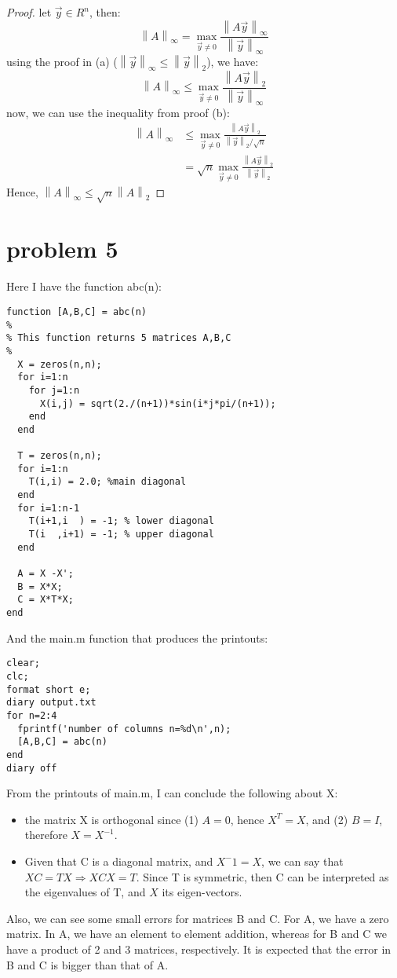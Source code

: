 \documentclass[10pt]{article}
\newcommand{\normi}[1]{\left\lVert#1\right\rVert_\infty}
\newcommand{\normt}[1]{\left\lVert#1\right\rVert_2}
\begin{document}
\begin{proof}
  let $\vec{y}\in R^n$, then:
  \[
    \normi{A} = \max_{\vec{y}\neq 0} \frac{\normi{A\vec{y}}}{\normi{\vec{y}}}
  \]
    using the proof in (a) ($\normi{\vec{y}} \leq \normt{\vec{y}}$), we have:
  \[
    \normi{A} \leq \max_{\vec{y}\neq 0} \frac{\normt{A\vec{y}}}{\normi{\vec{y}}}
  \]
   now, we can use the inequality from proof (b):
  \begin{align*}
   \normi{A} &\leq \max_{\vec{y}\neq 0} \frac{\normt{A\vec{y}}}{\normt{\vec{y}}/\sqrt{n}} \\ 
             & = \sqrt{n} \max_{\vec{y}\neq 0} \frac{\normt{A\vec{y}}}{\normt{\vec{y}}}
  \end{align*}
  Hence, $\normi{A} \leq \sqrt{n} \normt{A}$
\end{proof}


\section{problem 5}


Here I have the function abc(n):
\begin{verbatim}
function [A,B,C] = abc(n)
%
% This function returns 5 matrices A,B,C
%
  X = zeros(n,n);
  for i=1:n
    for j=1:n
      X(i,j) = sqrt(2./(n+1))*sin(i*j*pi/(n+1));
    end
  end

  T = zeros(n,n);
  for i=1:n
    T(i,i) = 2.0; %main diagonal
  end
  for i=1:n-1
    T(i+1,i  ) = -1; % lower diagonal
    T(i  ,i+1) = -1; % upper diagonal
  end

  A = X -X';
  B = X*X;
  C = X*T*X;
end 
\end{verbatim}

And the main.m function that produces the printouts:
\begin{verbatim}
clear;
clc; 
format short e; 
diary output.txt 
for n=2:4 
  fprintf('number of columns n=%d\n',n);
  [A,B,C] = abc(n)
end
diary off
\end{verbatim}

From the printouts of main.m, I can conclude the following about X:
\begin{itemize}
\item the matrix X is orthogonal since (1) $A=0$, hence $X^T=X$, and (2) 
      $B = I$, therefore $X=X^{-1}$.
\item Given that C is a diagonal matrix, and $X^-1 = X$, we can say that 
      $XC = TX 	\Rightarrow XCX = T$. Since T is symmetric, then C can
be interpreted as the eigenvalues of T, and $X$ its eigen-vectors.
\end{itemize}

Also, we can see some small errors for matrices B and C. For A, we
have a zero matrix. In A, we have an element to element addition, whereas
for B and C we have a product of 2 and 3 matrices, respectively. It is 
expected that the error in B and C is bigger than that of A.
\end{document}
